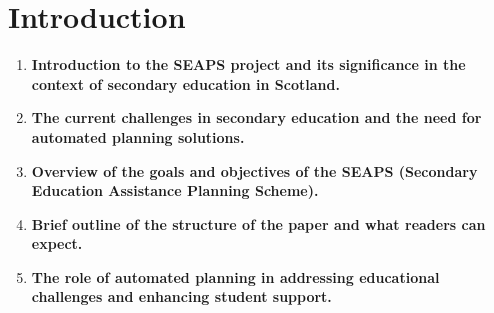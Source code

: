 \section{Introduction}
\begin{enumerate}
    \item \textbf{Introduction to the SEAPS project and its significance in the context of secondary education in Scotland.}
    \item \textbf{The current challenges in secondary education and the need for automated planning solutions.}
    \item \textbf{Overview of the goals and objectives of the SEAPS (Secondary Education Assistance Planning Scheme).}
    \item \textbf{Brief outline of the structure of the paper and what readers can expect.}
    \item \textbf{The role of automated planning in addressing educational challenges and enhancing student support.}
\end{enumerate}